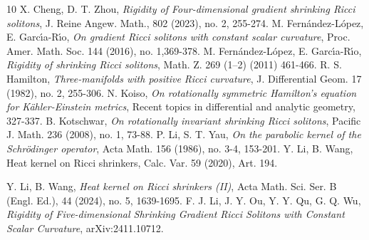 \documentclass[a4, 12pt]{amsart}
\theoremstyle{plain}
\begin{document}
\begin{thebibliography}{10}
	X. Cheng, D. T. Zhou, {\em Rigidity of Four-dimensional gradient shrinking Ricci solitons}, J. Reine Angew. Math., 802 (2023), no. 2, 255-274.
	M. Fern\'{a}ndez-L\'{o}pez, E. Garc\'{\i}a-R\'{\i}o, {\em On gradient Ricci solitons with constant scalar curvature}, Proc. Amer. Math. Soc. 144 (2016), no. 1,369-378.
	M. Fern\'{a}ndez-L\'{o}pez, E. Garc\'{\i}a-R\'{\i}o, {\em Rigidity of shrinking Ricci solitons}, Math. Z. 269 (1–2) (2011) 461-466.
	R. S. Hamilton, {\em Three-manifolds with positive Ricci curvature}, J. Differential Geom.  17  (1982), no. 2, 255-306.
	N. Koiso, {\em On rotationally symmetric Hamilton's equation for K\"ahler-Einstein metrics}, Recent topics in differential and analytic geometry, 327-337.
	B. Kotschwar, {\em On rotationally invariant shrinking Ricci solitons}, Pacific J. Math. 236 (2008), no. 1, 73-88.
	P. Li, S. T. Yau, {\em On the parabolic kernel of the Schr\"odinger operator}, Acta Math.  156  (1986),  no. 3-4, 153-201.
	 Y. Li, B. Wang, Heat kernel on Ricci shrinkers, Calc. Var. 59 (2020), Art. 194.
	
	Y. Li, B. Wang, {\em  Heat kernel on Ricci shrinkers (II)}, Acta Math. Sci. Ser. B (Engl. Ed.), 44 (2024), no. 5, 1639-1695.
	F. J. Li, J. Y. Ou, Y. Y. Qu, G. Q. Wu, {\em Rigidity of Five-dimensional Shrinking Gradient Ricci Solitons with Constant Scalar Curvature}, arXiv:2411.10712.
	

\end{thebibliography}
\end{document}
